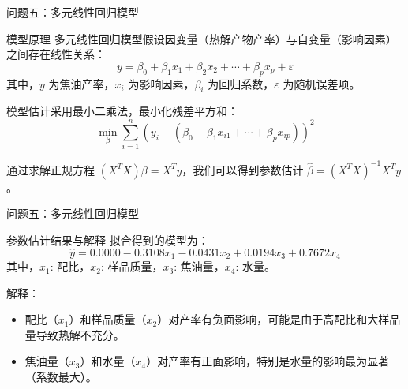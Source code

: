 \documentclass{beamer}
\begin{document}
\begin{frame}{问题五：多元线性回归模型}
    \scriptsize
    \begin{block}{模型原理}
        多元线性回归模型假设因变量（热解产物产率）与自变量（影响因素）之间存在线性关系：
        \[y = \beta_0 + \beta_1 x_1 + \beta_2 x_2 + \cdots + \beta_p x_p + \varepsilon\]
        其中，$y$ 为焦油产率，$x_i$ 为影响因素，$\beta_i$ 为回归系数，$\varepsilon$ 为随机误差项。
        
        模型估计采用最小二乘法，最小化残差平方和：
        \[\min_{\beta} \sum_{i=1}^n (y_i - (\beta_0 + \beta_1 x_{i1} + \cdots + \beta_p x_{ip}))^2\]
        
        通过求解正规方程 $(X^T X)\beta = X^T y$，我们可以得到参数估计 $\hat{\beta} = (X^T X)^{-1} X^T y$。
    \end{block}
\end{frame}
\begin{frame}{问题五：多元线性回归模型}
    \begin{block}{参数估计结果与解释}
        拟合得到的模型为：
        \[\hat{y} = 0.0000 - 0.3108x_1 - 0.0431x_2 + 0.0194x_3 + 0.7672x_4\]
        其中，$x_1$: 配比，$x_2$: 样品质量，$x_3$: 焦油量，$x_4$: 水量。
        
        解释：
        \begin{itemize}
            \item 配比（$x_1$）和样品质量（$x_2$）对产率有负面影响，可能是由于高配比和大样品量导致热解不充分。
            \item 焦油量（$x_3$）和水量（$x_4$）对产率有正面影响，特别是水量的影响最为显著（系数最大）。
        \end{itemize}
    \end{block}
\end{frame}
\end{document}
